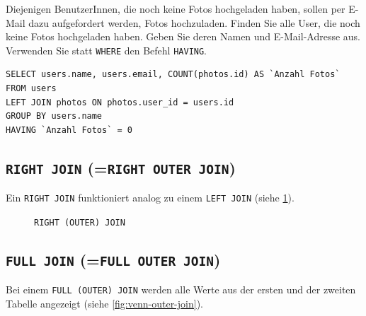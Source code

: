 \begin{myexercise}
  Diejenigen BenutzerInnen, die noch keine Fotos hochgeladen haben, sollen per E-Mail dazu aufgefordert werden, Fotos hochzuladen. Finden Sie alle User, die noch keine Fotos hochgeladen haben. Geben Sie deren Namen und E-Mail-Adresse aus. Verwenden Sie statt \lstinline|WHERE| den Befehl \lstinline|HAVING|.
  \begin{myanswer}
    \begin{lstlisting}
SELECT users.name, users.email, COUNT(photos.id) AS `Anzahl Fotos`
FROM users
LEFT JOIN photos ON photos.user_id = users.id
GROUP BY users.name
HAVING `Anzahl Fotos` = 0
\end{lstlisting}
  \end{myanswer}
\end{myexercise}

\subsection{\texorpdfstring{\lstinline|RIGHT JOIN| (=\lstinline|RIGHT OUTER JOIN|)}{RIGHT JOIN (=RIGHT OUTER JOIN)}}
Ein \lstinline|RIGHT JOIN| funktioniert analog zu einem \lstinline|LEFT JOIN| (siehe \cref{fig:venn-right-join}).

\begin{figure}[H]
  \centering
  \caption{\lstinline|RIGHT (OUTER) JOIN|}
  \label{fig:venn-right-join}
\end{figure}


\subsection{\texorpdfstring{\lstinline|FULL JOIN| (=\lstinline|FULL OUTER JOIN|)}{FULL JOIN (=FULL OUTER JOIN)}}
Bei einem \lstinline|FULL (OUTER) JOIN| werden alle Werte aus der ersten und der zweiten Tabelle angezeigt (siehe \cref{fig:venn-outer-join}).

